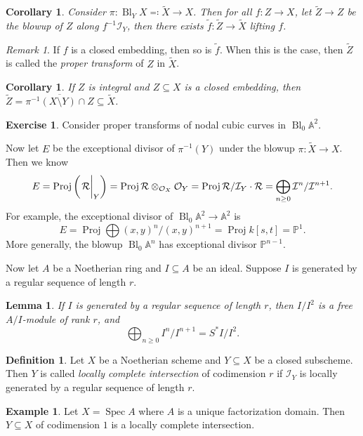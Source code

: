 \documentclass[leqno, openany]{memoir}
\newtheorem{cor}[thm]{Corollary}
\newtheorem{lem}[thm]{Lemma}
\theoremstyle{definition}
\newtheorem{defn}[thm]{Definition}
\newtheorem{exm}[thm]{Example}
\newtheorem{exer}[thm]{Exercise}
\theoremstyle{remark}
\newtheorem{rmk}[thm]{Remark}
\theoremstyle{plain}
\theoremstyle{definition}
\theoremstyle{remark}
\newcommand{\A}{\mathbb{A}}
\renewcommand{\P}{\mathbb{P}}
\newcommand{\mc}[1]{\mathcal{#1}}
\newcommand{\ol}[1]{\overline{#1}}
\newcommand{\wt}[1]{\widetilde{#1}}
\DeclareMathOperator{\Spec}{Spec}
\DeclareMathOperator{\Proj}{Proj}
\DeclareMathOperator{\Bl}{Bl}
\begin{document}
\begin{cor}
    Consider $\pi \colon \Bl_Y X \eqqcolon \wt{X} \to X$. Then for all $f \colon Z \to X$, let $\wt{Z} \to Z$ be the blowup of $Z$ along $f^{-1} \mc{I}_Y$, then there exists $\wt{f} \colon \wt{Z} \to \wt{X}$ lifting $f$.
\end{cor}

\begin{rmk}
    If $f$ is a closed embedding, then so is $\wt{f}$. When this is the case, then $\wt{Z}$ is called the \textit{proper transform} of $Z$ in $\wt{X}$. 
\end{rmk}

\begin{cor}
    If $Z$ is integral and $Z \subseteq X$ is a closed embedding, then $\wt{Z} = \ol{\pi^{-1}(X \setminus Y) \cap Z} \subseteq \wt{X}$.
\end{cor}

\begin{exer}
    Consider proper transforms of nodal cubic curves in $\Bl_0 \A^2$.
\end{exer}

Now let $E$ be the exceptional divisor of $\pi^{-1}(Y)$ under the blowup $\pi \colon \wt{X} \to X$. Then we know 
\[ E = \Proj \qty(\eval{\mc{R}}_Y) = \Proj \mc{R} \otimes_{\mc{O}_X} \mc{O}_Y = \Proj \mc{R} / \mc{I}_Y \cdot \mc{R} = \bigoplus_{n \geq 0} \mc{I}^n / \mc{I}^{n+1}. \]
For example, the exceptional divisor of $\Bl_0 \A^2 \to \A^2$ is 
\[ E = \Proj \bigoplus {(x,y)}^n / {(x,y)}^{n+1} = \Proj k[s,t] = \P^1. \]
More generally, the blowup $\Bl_0 \A^n$ has exceptional divisor $\P^{n-1}$.

Now let $A$ be a Noetherian ring and $I \subseteq A$ be an ideal. Suppose $I$ is generated by a regular sequence of length $r$. 
\begin{lem}
    If $I$ is generated by a regular sequence of length $r$, then $I/I^2$ is a free $A/I$-module of rank $r$, and 
    \[ \bigoplus_{n \geq 0} I^n / I^{n+1} = S^* I/I^2. \]
\end{lem}

\begin{defn}
    Let $X$ be a Noetherian scheme and $Y \subseteq X$ be a closed subscheme. Then $Y$ is called \textit{locally complete intersection} of codimension $r$ if $\mc{I}_Y$ is locally generated by a regular sequence of length $r$.
\end{defn}

\begin{exm}
    Let $X = \Spec A$ where $A$ is a unique factorization domain. Then $Y \subseteq X$ of codimension $1$ is a locally complete intersection.
\end{exm}
\end{document}
